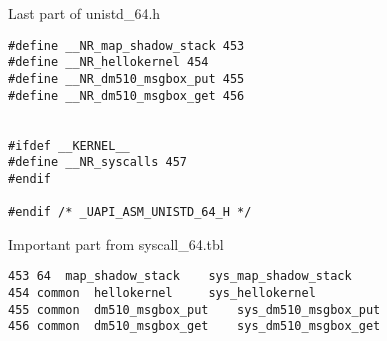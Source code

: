 \documentclass[12pt,a4paper]{report}
\begin{document}
Last part of unistd\_64.h
\begin{verbatim}
#define __NR_map_shadow_stack 453
#define __NR_hellokernel 454
#define __NR_dm510_msgbox_put 455
#define __NR_dm510_msgbox_get 456


#ifdef __KERNEL__
#define __NR_syscalls 457
#endif

#endif /* _UAPI_ASM_UNISTD_64_H */
\end{verbatim}
Important part from syscall\_64.tbl
\begin{verbatim}
453	64	map_shadow_stack	sys_map_shadow_stack
454 common  hellokernel     sys_hellokernel
455 common  dm510_msgbox_put    sys_dm510_msgbox_put
456 common  dm510_msgbox_get    sys_dm510_msgbox_get
\end{verbatim}
\end{document}
